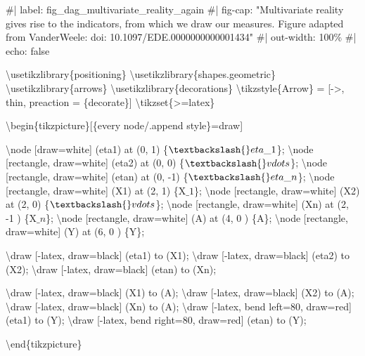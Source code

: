 \documentclass[
  letterpaper,
  DIV=11,
  numbers=noendperiod]{scrartcl}
\newenvironment{Shaded}{\begin{snugshade}}{\end{snugshade}}
\newcommand{\NormalTok}[1]{\textcolor[rgb]{0.00,0.23,0.31}{#1}}
\begin{document}
\begin{Shaded}
\begin{Highlighting}[]
\NormalTok{\#| label: fig\_dag\_multivariate\_reality\_again}
\NormalTok{\#| fig{-}cap: "Multivariate reality gives rise to the indicators, from which we draw our measures. Figure adapted from VanderWeele: doi: 10.1097/EDE.0000000000001434"}
\NormalTok{\#| out{-}width: 100\%}
\NormalTok{\#| echo: false}

\NormalTok{\textbackslash{}usetikzlibrary\{positioning\}}
\NormalTok{\textbackslash{}usetikzlibrary\{shapes.geometric\}}
\NormalTok{\textbackslash{}usetikzlibrary\{arrows\}}
\NormalTok{\textbackslash{}usetikzlibrary\{decorations\}}
\NormalTok{\textbackslash{}tikzstyle\{Arrow\} = [{-}\textgreater{}, thin, preaction = \{decorate\}]}
\NormalTok{\textbackslash{}tikzset\{\textgreater{}=latex\}}

\NormalTok{\textbackslash{}begin\{tikzpicture\}[\{every node/.append style\}=draw]}


\NormalTok{\textbackslash{}node [draw=white] (eta1) at (0, 1) \{$\textbackslash{}eta\_1$\};}
\NormalTok{\textbackslash{}node [rectangle, draw=white] (eta2) at (0, 0) \{$\textbackslash{}vdots$\};}
\NormalTok{\textbackslash{}node [rectangle, draw=white] (etan) at (0, {-}1) \{$\textbackslash{}eta\_n$\};}
\NormalTok{\textbackslash{}node [rectangle, draw=white] (X1) at (2, 1) \{X$\_1$\};}
\NormalTok{\textbackslash{}node [rectangle, draw=white] (X2) at (2, 0) \{$\textbackslash{}vdots$\};}
\NormalTok{\textbackslash{}node [rectangle, draw=white] (Xn) at (2, {-}1 ) \{X$\_n$\};}
\NormalTok{\textbackslash{}node [rectangle, draw=white] (A) at (4, 0 ) \{A\};}
\NormalTok{\textbackslash{}node [rectangle, draw=white] (Y) at (6, 0 ) \{Y\};}



\NormalTok{\textbackslash{}draw [{-}latex, draw=black] (eta1) to (X1);}
\NormalTok{\textbackslash{}draw [{-}latex, draw=black] (eta2) to (X2);}
\NormalTok{\textbackslash{}draw [{-}latex, draw=black] (etan) to (Xn);}

\NormalTok{\textbackslash{}draw [{-}latex, draw=black] (X1) to (A);}
\NormalTok{\textbackslash{}draw [{-}latex, draw=black] (X2) to (A);}
\NormalTok{\textbackslash{}draw [{-}latex, draw=black] (Xn) to (A);}
\NormalTok{\textbackslash{}draw [{-}latex, bend left=80, draw=red] (eta1) to (Y);}
\NormalTok{\textbackslash{}draw [{-}latex, bend right=80, draw=red] (etan) to (Y);}



\NormalTok{\textbackslash{}end\{tikzpicture\}}
\end{Highlighting}
\end{Shaded}
\end{document}
